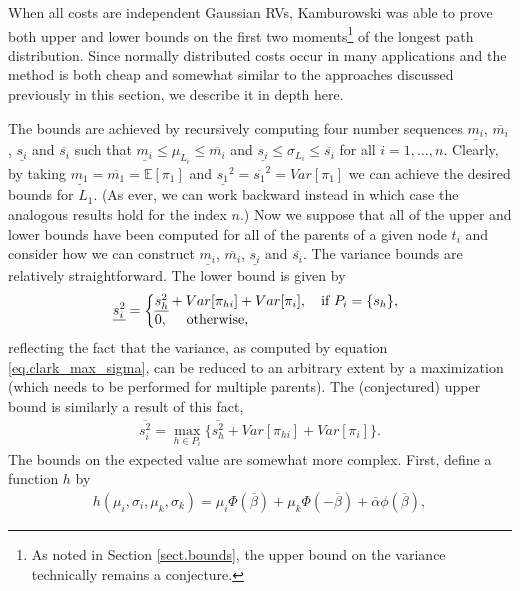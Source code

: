 \documentclass[12pt]{article}
\def\E{\mathbb{E}}
\begin{document}
When all costs are independent Gaussian RVs, Kamburowski was able to prove both upper and lower bounds on the first two moments\footnote{As noted in Section \ref{sect.bounds}, the upper bound on the variance technically remains a conjecture.} of the longest path distribution. Since normally distributed costs occur in many applications and the method is both cheap and somewhat similar to the approaches discussed previously in this section, we describe it in depth here.

The bounds are achieved by recursively computing four number sequences $\underline{m_i}$, $\overline{m_i}$, $\underline{s_i}$ and  $\overline{s_i}$ such that $\underline{m_i} \leq \mu_{L_i} \leq \overline{m_i}$ and $ \underline{s_i} \leq \sigma_{L_i} \leq \overline{s_i}$ for all $i = 1, \dots, n$. Clearly, by taking $\underline{m_1} = \overline{m_1} = \E[\pi_1]$ and $\underline{s_1}^2 = \overline{s_1}^2 = Var[\pi_1]$ we can achieve the desired bounds for $L_1$. (As ever, we can work backward instead in which case the analogous results hold for the index $n$.) Now we suppose that all of the upper and lower bounds have been computed for all of the parents of a given node $t_i$ and consider how we can construct  $\underline{m_i}$, $\overline{m_i}$, $\underline{s_i}$ and  $\overline{s_i}$. The variance bounds are relatively straightforward. The lower bound is given by
\begin{equation}
\underline{s_i^2} =\left\{
\begin{array}{@{}ll@{}}
\underline{s_h^2} + Var[\pi_{hi}] + Var[\pi_{i}], \quad  \text{if $P_i = \{s_h\}$,} \\
0,  \quad \text{ otherwise},
\end{array}\right.
\label{eq.si_under}
\end{equation}
reflecting the fact that the variance, as computed by equation \eqref{eq.clark_max_sigma}, can be reduced to an arbitrary extent by a maximization (which needs to be performed for multiple parents). The (conjectured) upper bound is similarly a result of this fact,
\begin{align}
  \label{eq.si_over}
  \overline{s_i^2} = \max_{h \in P_i}\{ \overline{s_h^2} + Var[\pi_{hi}] + Var[\pi_{i}]\}.
\end{align}
The bounds on the expected value are somewhat more complex. First, define a function $h$ by
\begin{align*}
  h(\mu_i, \sigma_i, \mu_k, \sigma_k) = \mu_i \Phi(\overline{\beta}) + \mu_k \Phi(-\overline{\beta}) + \overline{\alpha} \phi(\overline{\beta}),
\end{align*}
\end{document}
